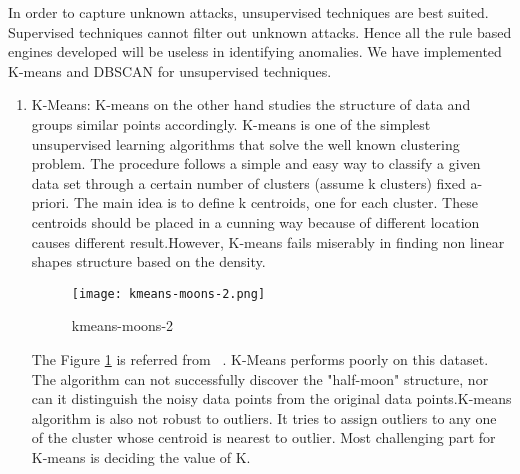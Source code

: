 \documentclass{acm_proc_article-sp}
\begin{document}
In order to capture unknown attacks, unsupervised techniques are best suited. Supervised techniques cannot filter out unknown attacks. Hence all the rule based engines developed will be useless in identifying anomalies. We have implemented K-means and DBSCAN for unsupervised techniques.
\begin{enumerate}
\item K-Means: K-means on the other hand studies the structure of data and groups similar points accordingly. K-means is one of the simplest unsupervised learning algorithms that solve the well known clustering problem. The procedure follows a simple and easy way to classify a given data set through a certain number of clusters (assume k clusters) fixed a-priori. The main idea is to define k centroids, one for each cluster. These centroids should be placed in a cunning way because of different location causes different result.However, K-means fails miserably in finding non linear shapes structure based on the density.

\begin{figure}[h]
\texttt{[image: kmeans-moons-2.png]}
\centering
\caption{kmeans-moons-2}
\label{kmeans-moons-2}
\end{figure}
The Figure \ref{kmeans-moons-2} is referred from ~\cite{www-dominodatalab}.
K-Means performs poorly on this dataset. The algorithm can not successfully discover the "half-moon" structure, nor can it distinguish the noisy data points from the original data points.K-means algorithm is also not robust to outliers. It tries to assign outliers to any one of the cluster whose centroid is nearest to outlier. Most challenging part for K-means is deciding the value of K. 


\end{enumerate}
\end{document}
